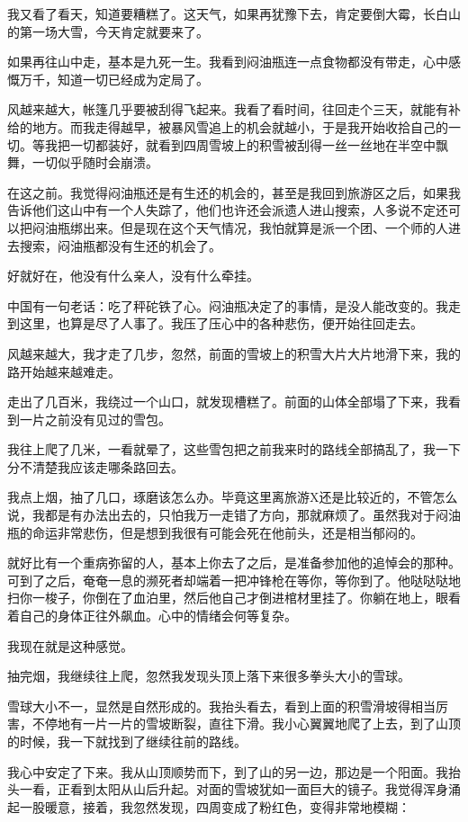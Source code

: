 我又看了看天，知道要糟糕了。这天气，如果再犹豫下去，肯定要倒大霉，长白山的第一场大雪，今天肯定就要来了。

如果再往山中走，基本是九死一生。我看到闷油瓶连一点食物都没有带走，心中感慨万千，知道一切已经成为定局了。

风越来越大，帐篷几乎要被刮得飞起来。我看了看时间，往回走个三天，就能有补给的地方。而我走得越早，被暴风雪追上的机会就越小，于是我开始收拾自己的一切。等我把一切都装好，就看到四周雪坡上的积雪被刮得一丝一丝地在半空中飘舞，一切似乎随时会崩溃。

在这之前。我觉得闷油瓶还是有生还的机会的，甚至是我回到旅游区之后，如果我告诉他们这山中有一个人失踪了，他们也许还会派遗人进山搜索，人多说不定还可以把闷油瓶绑出来。但是现在这个天气情况，我怕就算是派一个团、一个师的人进去搜索，闷油瓶都没有生还的机会了。

好就好在，他没有什么亲人，没有什么牵挂。

中国有一句老话：吃了秤砣铁了心。闷油瓶决定了的事情，是没人能改变的。我走到这里，也算是尽了人事了。我压了压心中的各种悲伤，便开始往回走去。

风越来越大，我才走了几步，忽然，前面的雪坡上的积雪大片大片地滑下来，我的路开始越来越难走。

走出了几百米，我绕过一个山口，就发现槽糕了。前面的山体全部塌了下来，我看到一片之前没有见过的雪包。

我往上爬了几米，一看就晕了，这些雪包把之前我来时的路线全部搞乱了，我一下分不清楚我应该走哪条路回去。

我点上烟，抽了几口，琢磨该怎么办。毕竟这里离旅游X还是比较近的，不管怎么说，我都是有办法出去的，只怕我万一走错了方向，那就麻烦了。虽然我对于闷油瓶的命运非常悲伤，但是想到我很有可能会死在他前头，还是相当郁闷的。

就好比有一个重病弥留的人，基本上你去了之后，是准备参加他的追悼会的那种。可到了之后，奄奄一息的濒死者却端着一把冲锋枪在等你，等你到了。他哒哒哒地扫你一梭子，你倒在了血泊里，然后他自己才倒进棺材里挂了。你躺在地上，眼看着自己的身体正往外飙血。心中的情绪会何等复杂。

我现在就是这种感觉。

抽完烟，我继续往上爬，忽然我发现头顶上落下来很多拳头大小的雪球。

雪球大小不一，显然是自然形成的。我抬头看去，看到上面的积雪滑坡得相当厉害，不停地有一片一片的雪坡断裂，直往下滑。我小心翼翼地爬了上去，到了山顶的时候，我一下就找到了继续往前的路线。

我心中安定了下来。我从山顶顺势而下，到了山的另一边，那边是一个阳面。我抬头一看，正看到太阳从山后升起。对面的雪坡犹如一面巨大的镜子。我觉得浑身涌起一股暖意，接着，我忽然发现，四周变成了粉红色，变得非常地模糊：


